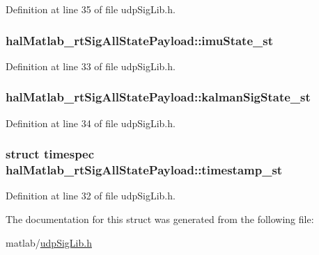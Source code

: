 Definition at line 35 of file udp\+Sig\+Lib.\+h.

\hypertarget{structhalMatlab__rtSigAllStatePayload_a077a67bc0c0d249d0e4bfb7287676646_a077a67bc0c0d249d0e4bfb7287676646}{
\subsubsection[{imu\+State\+\_\+st}]{ hal\+Matlab\+\_\+rt\+Sig\+All\+State\+Payload\+::imu\+State\+\_\+st}}\label{structhalMatlab__rtSigAllStatePayload_a077a67bc0c0d249d0e4bfb7287676646_a077a67bc0c0d249d0e4bfb7287676646}


Definition at line 33 of file udp\+Sig\+Lib.\+h.

\hypertarget{structhalMatlab__rtSigAllStatePayload_a125a952adeb10a6d7391f2b0acfcaae2_a125a952adeb10a6d7391f2b0acfcaae2}{
\subsubsection[{kalman\+Sig\+State\+\_\+st}]{ hal\+Matlab\+\_\+rt\+Sig\+All\+State\+Payload\+::kalman\+Sig\+State\+\_\+st}}\label{structhalMatlab__rtSigAllStatePayload_a125a952adeb10a6d7391f2b0acfcaae2_a125a952adeb10a6d7391f2b0acfcaae2}


Definition at line 34 of file udp\+Sig\+Lib.\+h.

\hypertarget{structhalMatlab__rtSigAllStatePayload_a2526e3f137ca373500385c769c69b897_a2526e3f137ca373500385c769c69b897}{
\subsubsection[{timestamp\+\_\+st}]{\setlength{\rightskip}{0pt plus 5cm}struct timespec hal\+Matlab\+\_\+rt\+Sig\+All\+State\+Payload\+::timestamp\+\_\+st}}\label{structhalMatlab__rtSigAllStatePayload_a2526e3f137ca373500385c769c69b897_a2526e3f137ca373500385c769c69b897}


Definition at line 32 of file udp\+Sig\+Lib.\+h.



The documentation for this struct was generated from the following file\+:\begin{DoxyCompactItemize}
\item 
matlab/\hyperlink{udpSigLib_8h}{udp\+Sig\+Lib.\+h}\end{DoxyCompactItemize}
